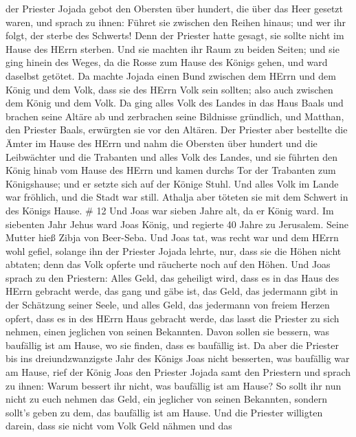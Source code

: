 der Priester Jojada gebot den Obersten über hundert, die über das Heer
gesetzt waren, und sprach zu ihnen: Führet sie zwischen den Reihen
hinaus; und wer ihr folgt, der sterbe des Schwerts! Denn der Priester
hatte gesagt, sie sollte nicht im Hause des HErrn sterben. 
Und sie machten ihr Raum zu beiden Seiten; und sie ging hinein des
Weges, da die Rosse zum Hause des Königs gehen, und ward daselbst
getötet.  Da machte Jojada einen Bund zwischen dem HErrn
und dem König und dem Volk, dass sie des HErrn Volk sein sollten; also
auch zwischen dem König und dem Volk.  Da ging alles Volk
des Landes in das Haus Baals und brachen seine Altäre ab und zerbrachen
seine Bildnisse gründlich, und Matthan, den Priester Baals, erwürgten
sie vor den Altären. Der Priester aber bestellte die Ämter im Hause des
HErrn  und nahm die Obersten über hundert und die
Leibwächter und die Trabanten und alles Volk des Landes, und sie führten
den König hinab vom Hause des HErrn und kamen durchs Tor der Trabanten
zum Königshause; und er setzte sich auf der Könige Stuhl. 
Und alles Volk im Lande war fröhlich, und die Stadt war still. Athalja
aber töteten sie mit dem Schwert in des Königs Hause. \# 12 
Und Joas war sieben Jahre alt, da er König ward.  Im
siebenten Jahr Jehus ward Joas König, und regierte 40 Jahre zu
Jerusalem. Seine Mutter hieß Zibja von Beer-Seba.  Und Joas
tat, was recht war und dem HErrn wohl gefiel, solange ihn der Priester
Jojada lehrte,  nur, dass sie die Höhen nicht abtaten; denn
das Volk opferte und räucherte noch auf den Höhen.  Und Joas
sprach zu den Priestern: Alles Geld, das geheiligt wird, dass es in das
Haus des HErrn gebracht werde, das gang und gäbe ist, das Geld, das
jedermann gibt in der Schätzung seiner Seele, und alles Geld, das
jedermann von freiem Herzen opfert, dass es in des HErrn Haus gebracht
werde,  das lasst die Priester zu sich nehmen, einen
jeglichen von seinen Bekannten. Davon sollen sie bessern, was baufällig
ist am Hause, wo sie finden, dass es baufällig ist.  Da aber
die Priester bis ins dreiundzwanzigste Jahr des Königs Joas nicht
besserten, was baufällig war am Hause,  rief der König Joas
den Priester Jojada samt den Priestern und sprach zu ihnen: Warum
bessert ihr nicht, was baufällig ist am Hause? So sollt ihr nun nicht zu
euch nehmen das Geld, ein jeglicher von seinen Bekannten, sondern
sollt's geben zu dem, das baufällig ist am Hause.  Und die
Priester willigten darein, dass sie nicht vom Volk Geld nähmen und das
